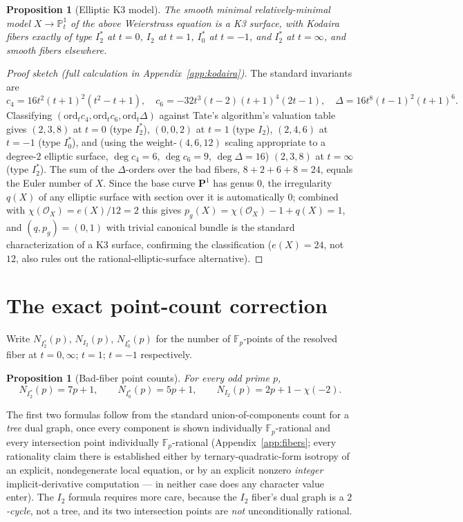 \documentclass[11pt]{amsart}
\newtheorem{proposition}[theorem]{Proposition}
\theoremstyle{definition}
\newcommand{\Fp}{\mathbb{F}_p}
\begin{document}
\begin{proposition}[Elliptic K3 model]
\label{prop:X}
The smooth minimal relatively-minimal model $X\to\mathbb P^1_t$ of the above Weierstrass equation is a K3 surface, with Kodaira fibers exactly of type $I_2^*$ at $t=0$, $I_2$ at $t=1$, $I_0^*$ at $t=-1$, and $I_2^*$ at $t=\infty$, and smooth fibers elsewhere.
\end{proposition}

\begin{proof}[Proof sketch (full calculation in Appendix~\ref{app:kodaira})]
The standard invariants are
\[
c_4=16t^2(t+1)^2(t^2-t+1),\quad c_6=-32t^3(t-2)(t+1)^4(2t-1),\quad \Delta=16t^8(t-1)^2(t+1)^6.
\]
Classifying $(\mathrm{ord}_t c_4,\mathrm{ord}_t c_6,\mathrm{ord}_t\Delta)$ against Tate's algorithm's valuation table gives $(2,3,8)$ at $t=0$ (type $I_2^*$), $(0,0,2)$ at $t=1$ (type $I_2$), $(2,4,6)$ at $t=-1$ (type $I_0^*$), and (using the weight-$(4,6,12)$ scaling appropriate to a degree-$2$ elliptic surface, $\deg c_4=6$, $\deg c_6=9$, $\deg\Delta=16$) $(2,3,8)$ at $t=\infty$ (type $I_2^*$). The sum of the $\Delta$-orders over the bad fibers, $8+2+6+8=24$, equals the Euler number of $X$. Since the base curve $\mathbf P^1$ has genus $0$, the irregularity $q(X)$ of any elliptic surface with section over it is automatically $0$; combined with $\chi(\mathcal O_X)=e(X)/12=2$ this gives $p_g(X)=\chi(\mathcal O_X)-1+q(X)=1$, and $(q,p_g)=(0,1)$ with trivial canonical bundle is the standard characterization of a K3 surface, confirming the classification ($e(X)=24$, not $12$, also rules out the rational-elliptic-surface alternative).
\end{proof}

\section{The exact point-count correction}
\label{sec:pointcount}

Write $N_{I_2^*}(p)$, $N_{I_2}(p)$, $N_{I_0^*}(p)$ for the number of $\Fp$-points of the resolved fiber at $t=0,\infty$; $t=1$; $t=-1$ respectively.

\begin{proposition}[Bad-fiber point counts]
\label{prop:fibers}
For every odd prime $p$,
\[
N_{I_2^*}(p)=7p+1,\qquad N_{I_0^*}(p)=5p+1,\qquad
\boxed{N_{I_2}(p)=2p+1-\chi(-2)}.
\]
\end{proposition}

The first two formulas follow from the standard union-of-components count for a \emph{tree} dual graph, once every component is shown individually $\Fp$-rational and every intersection point individually $\Fp$-rational (Appendix~\ref{app:fibers}; every rationality claim there is established either by ternary-quadratic-form isotropy of an explicit, nondegenerate local equation, or by an explicit nonzero \emph{integer} implicit-derivative computation — in neither case does any character value enter). The $I_2$ formula requires more care, because the $I_2$ fiber's dual graph is a \emph{$2$-cycle}, not a tree, and its two intersection points are \emph{not} unconditionally rational.
\end{document}
